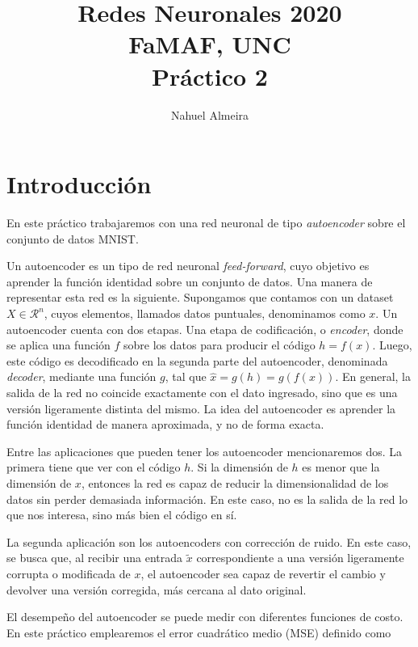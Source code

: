 \documentclass[10pt,twocolumn]{article}
\begin{document}
\author{Nahuel Almeira}

\title{Redes Neuronales 2020\\ FaMAF, UNC\\ Práctico 2}

\maketitle

\section{Introducción}

En este práctico trabajaremos con una red neuronal de tipo \emph{autoencoder} sobre el conjunto de datos MNIST.

Un autoencoder es un tipo de red neuronal \emph{feed-forward}, cuyo objetivo es aprender la función identidad sobre un conjunto de datos. Una manera de representar esta red es la siguiente. Supongamos que contamos con un dataset $X\in \mathcal{R}^n$, cuyos elementos, llamados datos puntuales, denominamos como $x$. Un autoencoder cuenta con dos etapas. Una etapa de codificación, o \emph{encoder}, donde se aplica una función $f$ sobre los datos para producir el código $h = f(x)$. Luego, este código es decodificado en la segunda parte del autoencoder, denominada \emph{decoder}, mediante una función $g$, tal que $\hat{x} = g(h) = g(f(x))$. En general, la salida de la red no coincide exactamente con el dato ingresado, sino que es una versión ligeramente distinta del mismo. La idea del autoencoder es aprender la función identidad de manera aproximada, y no de forma exacta.

Entre las aplicaciones que pueden tener los autoencoder mencionaremos dos. La primera tiene que ver con el código $h$. Si la dimensión de $h$ es menor que la dimensión de $x$, entonces la red es capaz de reducir la dimensionalidad de los datos sin perder demasiada información. En este caso, no es la salida de la red lo que nos interesa, sino más bien el código en sí. 

La segunda aplicación son los autoencoders con corrección de ruido. En este caso, se busca que, al recibir una entrada $\tilde{x}$ correspondiente a una versión ligeramente corrupta o modificada de $x$, el autoencoder sea capaz de revertir el cambio y devolver una versión corregida, más cercana al dato original.

El desempeño del autoencoder se puede medir con diferentes funciones de costo. En este práctico emplearemos el error cuadrático medio (MSE) definido como
\end{document}
